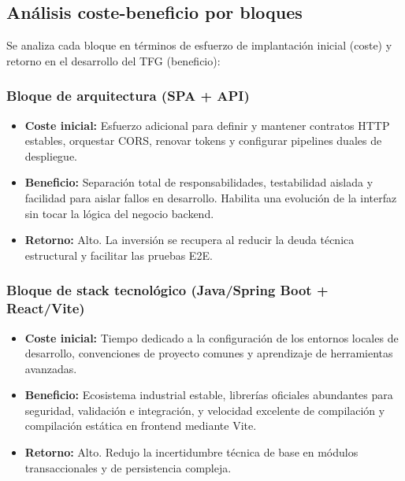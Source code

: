 \FloatBarrier
\subsection{An\'alisis coste-beneficio por bloques}

Se analiza cada bloque en t\'erminos de esfuerzo de implantaci\'on inicial (coste) y retorno en el desarrollo del TFG (beneficio):

\subsubsection*{Bloque de arquitectura (SPA + API)}
\begin{itemize}
    \item \textbf{Coste inicial:} Esfuerzo adicional para definir y mantener contratos HTTP estables, orquestar CORS, renovar tokens y configurar pipelines duales de despliegue.
    \item \textbf{Beneficio:} Separaci\'on total de responsabilidades, testabilidad aislada y facilidad para aislar fallos en desarrollo. Habilita una evoluci\'on de la interfaz sin tocar la l\'ogica del negocio backend.
    \item \textbf{Retorno:} Alto. La inversi\'on se recupera al reducir la deuda t\'ecnica estructural y facilitar las pruebas E2E.
\end{itemize}

\subsubsection*{Bloque de stack tecnol\'ogico (Java/Spring Boot + React/Vite)}
\begin{itemize}
    \item \textbf{Coste inicial:} Tiempo dedicado a la configuraci\'on de los entornos locales de desarrollo, convenciones de proyecto comunes y aprendizaje de herramientas avanzadas.
    \item \textbf{Beneficio:} Ecosistema industrial estable, librer\'ias oficiales abundantes para seguridad, validaci\'on e integraci\'on, y velocidad excelente de compilaci\'on y compilaci\'on est\'atica en frontend mediante Vite.
    \item \textbf{Retorno:} Alto. Redujo la incertidumbre t\'ecnica de base en m\'odulos transaccionales y de persistencia compleja.
\end{itemize}

